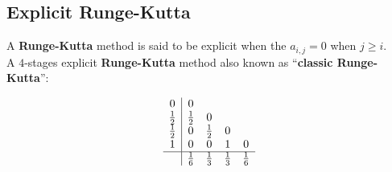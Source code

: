 \subsection{Explicit Runge-Kutta}

A \textbf{Runge-Kutta} method is said to be explicit when the $a_{i,j} = 0$ when $j \geq i$.\\

A $4$-stages explicit \textbf{Runge-Kutta} method also known as ``\textbf{classic Runge-Kutta}'':
%
\begin{center}
\begin{displaymath}
\begin{array}{c|cccc}
0 & 0 \\
\frac{1}{2} & \frac{1}{2} & 0 \\
\frac{1}{2} & 0 & \frac{1}{2} & 0 \\
1 & 0 & 0 & 1 & 0 \\
\hline
 & \frac{1}{6} & \frac{1}{3} & \frac{1}{3} & \frac{1}{6}
\end{array}
\end{displaymath}
\end{center}
